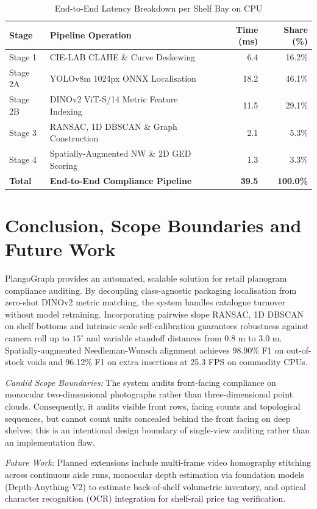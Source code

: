 \documentclass[conference]{IEEEtran}
\begin{document}
\begin{table}[h]
\centering
\caption{End-to-End Latency Breakdown per Shelf Bay on CPU}
\label{tab:latency}
\scriptsize
\begin{tabularx}{\columnwidth}{l X r r}
\toprule
\textbf{Stage} & \textbf{Pipeline Operation} & \textbf{Time (ms)} & \textbf{Share (\%)} \\
\midrule
Stage 1 & CIE-LAB CLAHE \& Curve Deskewing & 6.4 & 16.2\% \\
Stage 2A & YOLOv8m 1024px ONNX Localisation & 18.2 & 46.1\% \\
Stage 2B & DINOv2 ViT-S/14 Metric Feature Indexing & 11.5 & 29.1\% \\
Stage 3 & RANSAC, 1D DBSCAN \& Graph Construction & 2.1 & 5.3\% \\
Stage 4 & Spatially-Augmented NW \& 2D GED Scoring & 1.3 & 3.3\% \\
\midrule
\textbf{Total} & \textbf{End-to-End Compliance Pipeline} & \textbf{39.5} & \textbf{100.0\%} \\
\bottomrule
\end{tabularx}
\end{table}

\section{Conclusion, Scope Boundaries and Future Work}
PlangoGraph provides an automated, scalable solution for retail planogram compliance auditing. By decoupling class-agnostic packaging localisation from zero-shot DINOv2 metric matching, the system handles catalogue turnover without model retraining. Incorporating pairwise slope RANSAC, 1D DBSCAN on shelf bottoms and intrinsic scale self-calibration guarantees robustness against camera roll up to $15^\circ$ and variable standoff distances from 0.8 m to 3.0 m. Spatially-augmented Needleman-Wunsch alignment achieves 98.90\% F1 on out-of-stock voids and 96.12\% F1 on extra insertions at 25.3 FPS on commodity CPUs.

\textit{Candid Scope Boundaries:} The system audits front-facing compliance on monocular two-dimensional photographs rather than three-dimensional point clouds. Consequently, it audits visible front rows, facing counts and topological sequences, but cannot count units concealed behind the front facing on deep shelves; this is an intentional design boundary of single-view auditing rather than an implementation flaw.

\textit{Future Work:} Planned extensions include multi-frame video homography stitching across continuous aisle runs, monocular depth estimation via foundation models (Depth-Anything-V2) to estimate back-of-shelf volumetric inventory, and optical character recognition (OCR) integration for shelf-rail price tag verification.
\end{document}
